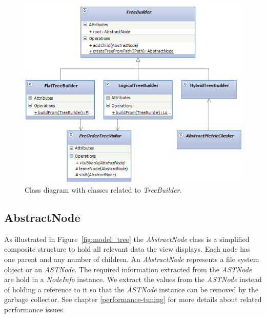 \documentclass[11pt,a4paper,oneside]{scrreprt}
\begin{document}
\begin{figure}[th]
\begin{center}
\includegraphics[width=\textwidth]{figures/model_treebuilder.png}
\end{center}
\caption{Class diagram with classes related to \textit{TreeBuilder}.}
\label{fig:model_treebuilder}
\end{figure}

\subsection{AbstractNode}
As illustrated in Figure~\ref{fig:model_tree} the \textit{AbstractNode} class is a simplified composite structure to hold all relevant data the view displays. Each node has one parent and any number of children. An \textit{AbstractNode} represents a file system object or an \textit{ASTNode}. The required information extracted from the \textit{ASTNode} are hold in a \textit{NodeInfo} instance. We extract the values from the \textit{ASTNode} instead of holding a reference to it so that the \textit{ASTNode} instance can be removed by the garbage collector. See chapter \ref{performance-tuning} for more details about related performance issues.
\end{document}
